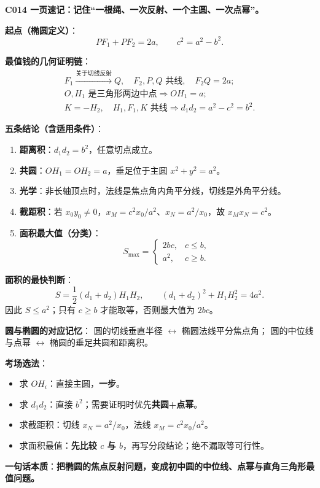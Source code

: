 \begin{summarybox}
\textbf{C014 一页速记：记住“一根绳、一次反射、一个主圆、一次点幂”。}

\textbf{起点（椭圆定义）}：
\[
PF_1+PF_2=2a,\qquad c^2=a^2-b^2.
\]

\textbf{最值钱的几何证明链}：
\[
\begin{gathered}
F_1\xrightarrow{\text{关于切线反射}}Q,\quad
F_2,P,Q\text{ 共线},\quad F_2Q=2a;\\
O,H_1\text{ 是三角形两边中点}
\Longrightarrow OH_1=a;\\
K=-H_2,\quad H_1,F_1,K\text{ 共线}
\Longrightarrow d_1d_2=a^2-c^2=b^2.
\end{gathered}
\]

\textbf{五条结论（含适用条件）}：
\begin{enumerate}
\item \textbf{距离积}：$\boxed{d_1d_2=b^2}$，任意切点成立。
\item \textbf{共圆}：$\boxed{OH_1=OH_2=a}$，垂足位于主圆 $x^2+y^2=a^2$。
\item \textbf{光学}：非长轴顶点时，法线是焦点角内角平分线，切线是外角平分线。
\item \textbf{截距积}：若 $x_0y_0\ne0$，$\boxed{x_M=c^2x_0/a^2}$、$\boxed{x_N=a^2/x_0}$，故 $\boxed{x_Mx_N=c^2}$。
\item \textbf{面积最大值（分类）}：
\[
\boxed{S_{\max}=\begin{cases}2bc,&c\le b,\\a^2,&c\ge b.\end{cases}}
\]
\end{enumerate}

\textbf{面积的最快判断}：
\[
S=\frac12(d_1+d_2)H_1H_2,\qquad
(d_1+d_2)^2+H_1H_2^2=4a^2.
\]
因此 $S\le a^2$；只有 $c\ge b$ 才能取等，否则最大值为 $2bc$。

\textbf{圆与椭圆的对应记忆}：
圆的切线垂直半径 $\longleftrightarrow$ 椭圆法线平分焦点角；
圆的中位线与点幂 $\longleftrightarrow$ 椭圆的垂足共圆和距离积。

\textbf{考场选法}：
\begin{itemize}
\item 求 $OH_i$：直接主圆，\textbf{一步}。
\item 求 $d_1d_2$：直接 $b^2$；需要证明时优先\textbf{共圆+点幂}。
\item 求截距积：切线 $x_N=a^2/x_0$，法线 $x_M=c^2x_0/a^2$。
\item 求面积最值：\textbf{先比较 $c$ 与 $b$}，再写分段结论；绝不漏取等可行性。
\end{itemize}

\textbf{一句话本质}：\textbf{把椭圆的焦点反射问题，变成初中圆的中位线、点幂与直角三角形最值问题。}
\end{summarybox}
